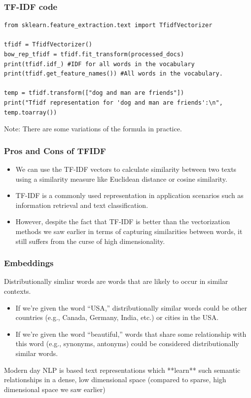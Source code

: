 \documentclass{beamer}
\begin{document}
\begin{frame}[fragile]
\frametitle{TF-IDF code}
\tiny
\begin{verbatim}
from sklearn.feature_extraction.text import TfidfVectorizer

tfidf = TfidfVectorizer()
bow_rep_tfidf = tfidf.fit_transform(processed_docs)
print(tfidf.idf_) #IDF for all words in the vocabulary
print(tfidf.get_feature_names()) #All words in the vocabulary.

temp = tfidf.transform(["dog and man are friends"])
print("Tfidf representation for 'dog and man are friends':\n", temp.toarray())
\end{verbatim}
Note: There are some variations of the formula in practice. 
\end{frame}

\begin{frame}
\frametitle{Pros and Cons of TFIDF}
\begin{itemize}
\item We can use the TF-IDF vectors to calculate similarity between two texts using a similarity measure like Euclidean distance or cosine similarity. 
\item TF-IDF is a commonly used representation in application scenarios such as information retrieval and text classification.  \pause
\item However, despite the fact that TF-IDF is better than the vectorization methods we saw earlier in terms of capturing similarities between words, it still suffers from the curse of high dimensionality. 
\end{itemize}
\end{frame}

\begin{frame}
\frametitle{Embeddings}
Distributionally simliar words are words that are likely to occur in similar contexts.
\begin{itemize}
\item If we’re given the word “USA,” distributionally similar words could be other countries (e.g., Canada, Germany, India, etc.) or cities in the USA. 
\item  If we’re given the word “beautiful,” words that share some relationship with this word (e.g., synonyms, antonyms) could be considered distributionally similar words. 
\end{itemize} \pause
Modern day NLP is based text representations which **learn** such semantic relationships in a dense, low dimensional space (compared to sparse, high dimensional space we saw earlier)
\end{frame}
\end{document}
